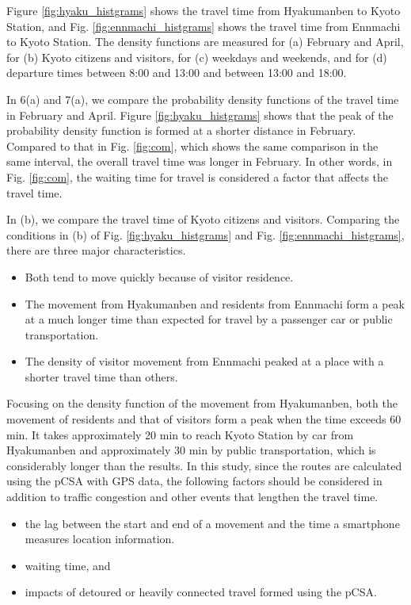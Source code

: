 \documentclass[conference]{IEEEtran}
\begin{document}
\par Figure \ref{fig:hyaku_histgrams} shows the travel time from Hyakumanben to Kyoto Station, and Fig. \ref{fig:ennmachi_histgrams} shows the travel time from Ennmachi to Kyoto Station.
The density functions are measured for (a) February and April, for (b) Kyoto citizens and visitors, for (c) weekdays and weekends, and for (d) departure times between 8:00 and 13:00 and between 13:00 and 18:00.
\par In 6(a) and 7(a), we compare the probability density functions of the travel time in February and April.
Figure \ref{fig:hyaku_histgrams} shows that the peak of the probability density function is formed at a shorter distance in February.
Compared to that in Fig. \ref{fig:com}, which shows the same comparison in the same interval, the overall travel time was longer in February.
In other words, in Fig. \ref{fig:com}, the waiting time for travel is considered a factor that affects the travel time.
\par In (b), we compare the travel time of Kyoto citizens and visitors.
Comparing the conditions in (b) of Fig. \ref{fig:hyaku_histgrams} and Fig. \ref{fig:ennmachi_histgrams}, there are three major characteristics.

\begin{itemize}
\item Both tend to move quickly because of visitor residence.
\item The movement from Hyakumanben and residents from Ennmachi form a peak at a much longer time than expected for travel by a passenger car or public transportation.
\item The density of visitor movement from Ennmachi peaked at a place with a shorter travel time than others.
\end{itemize}

Focusing on the density function of the movement from Hyakumanben, both the movement of residents and that of visitors form a peak when the time exceeds 60 min.
It takes approximately 20 min to reach Kyoto Station by car from Hyakumanben and approximately 30 min by public transportation, which is considerably longer than the results.
In this study, since the routes are calculated using the pCSA with GPS data, the following factors should be considered in addition to traffic congestion and other events that lengthen the travel time.

\begin{itemize}
\item the lag between the start and end of a movement and the time a smartphone measures location information.
\item waiting time, and
\item impacts of detoured or heavily connected travel formed using the pCSA.
\end{itemize}
\end{document}
